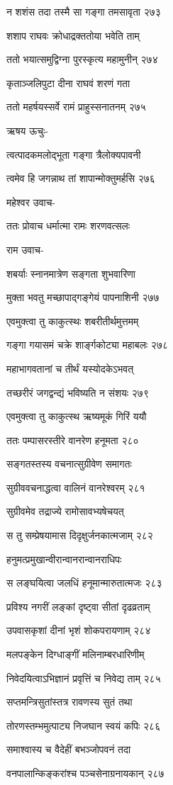 न शशंस तदा तस्मै सा गङ्गा तमसावृता २७३

शशाप राघवः क्रोधाद्रक्ततोया भवेति ताम्

ततो भयात्समुद्विग्ना पुरस्कृत्य महामुनीन् २७४

कृताञ्जलिपुटा दीना राघवं शरणं गता

ततो महर्षयस्सर्वे रामं प्राहुस्सनातनम् २७५

ऋषय ऊचुः-

त्वत्पादकमलोद्भूता गङ्गा त्रैलोक्यपावनी

त्वमेव हि जगन्नाथ तां शापान्मोक्तुमर्हसि २७६

महेश्वर उवाच-

ततः प्रोवाच धर्मात्मा रामः शरणवत्सलः

राम उवाच-

शबर्याः स्नानमात्रेण सङ्गता शुभवारिणा

मुक्ता भवतु मच्छापाद्गङ्गेयं पापनाशिनी २७७

एवमुक्त्वा तु काकुत्स्थः शबरीतीर्थमुत्तमम्

गङ्गा गयासमं चक्रे शार्ङ्गकोट्या महाबलः २७८

महाभागवतानां च तीर्थं यस्योदकेऽभवत्

तच्छरीरं जगद्वन्द्यं भविष्यति न संशयः २७९

एवमुक्त्वा तु काकुत्स्थ ऋष्यमूकं गिरिं ययौ

ततः पम्पासरस्तीरे वानरेण हनूमता २८०

सङ्गतस्तस्य वचनात्सुग्रीवेण समागतः

सुग्रीववचनाद्धत्वा वालिनं वानरेश्वरम् २८१

सुग्रीवमेव तद्राज्ये रामोसावभ्यषेचयत्

स तु सम्प्रेषयामास दिदृक्षुर्जनकात्मजाम् २८२

हनुमत्प्रमुखान्वीरान्वानरान्वानराधिपः

स लङ्घयित्वा जलधिं हनूमान्मारुतात्मजः २८३

प्रविश्य नगरीं लङ्कां दृष्ट्वा सीतां दृढव्रताम्

उपवासकृशां दीनां भृशं शोकपरायणाम् २८४

मलपङ्केन दिग्धाङ्गीं मलिनाम्बरधारिणीम्

निवेदयित्वाऽभिज्ञानं प्रवृत्तिं च निवेद्य ताम् २८५

सप्तमन्त्रिसुतांस्तत्र रावणस्य सुतं तथा

तोरणस्तम्भमुत्पाट्य निजघान स्वयं कपिः २८६

समाश्वास्य च वैदेहीं बभञ्जोपवनं तदा

वनपालान्किङ्करांश्च पञ्चसेनाग्रनायकान् २८७


